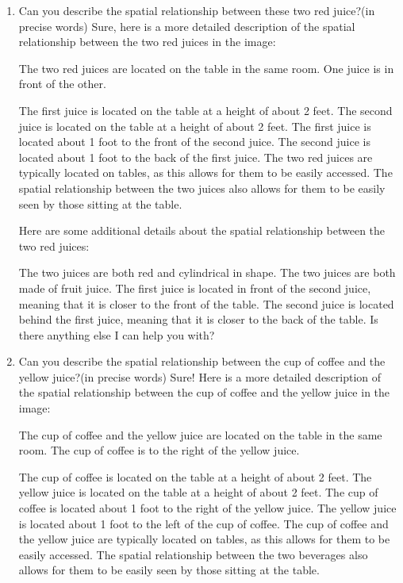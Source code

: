 \begin{enumerate}
    \item Can you describe the spatial relationship between these two red juice?(in precise words)
    \subitem Sure, here is a more detailed description of the spatial relationship between the two red juices in the image:

    The two red juices are located on the table in the same room. One juice is in front of the other.
    
    The first juice is located on the table at a height of about 2 feet.
    The second juice is located on the table at a height of about 2 feet.
    The first juice is located about 1 foot to the front of the second juice.
    The second juice is located about 1 foot to the back of the first juice.
    The two red juices are typically located on tables, as this allows for them to be easily accessed. The spatial relationship between the two juices also allows for them to be easily seen by those sitting at the table.
    
    Here are some additional details about the spatial relationship between the two red juices:
    
    The two juices are both red and cylindrical in shape.
    The two juices are both made of fruit juice.
    The first juice is located in front of the second juice, meaning that it is closer to the front of the table.
    The second juice is located behind the first juice, meaning that it is closer to the back of the table.
    Is there anything else I can help you with?
    \item Can you describe the spatial relationship between the cup of coffee and the yellow juice?(in precise words)
    \subitem 
    Sure! Here is a more detailed description of the spatial relationship between the cup of coffee and the yellow juice in the image:
    
    The cup of coffee and the yellow juice are located on the table in the same room. The cup of coffee is to the right of the yellow juice.
    
    The cup of coffee is located on the table at a height of about 2 feet.
    The yellow juice is located on the table at a height of about 2 feet.
    The cup of coffee is located about 1 foot to the right of the yellow juice.
    The yellow juice is located about 1 foot to the left of the cup of coffee.
    The cup of coffee and the yellow juice are typically located on tables, as this allows for them to be easily accessed. The spatial relationship between the two beverages also allows for them to be easily seen by those sitting at the table.
    

\end{enumerate}
